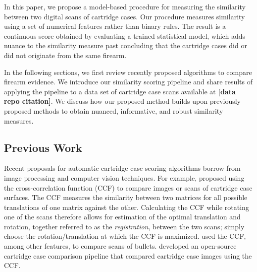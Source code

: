 \documentclass[preprint]{JASA}
\begin{document}
In this paper, we propose a model-based procedure for measuring the
similarity between two digital scans of cartridge cases. Our procedure
measures similarity using a set of numerical features rather than binary
rules. The result is a continuous score obtained by evaluating a trained
statistical model, which adds nuance to the similarity measure past
concluding that the cartridge cases did or did not originate from the
same firearm.

In the following sections, we first review recently proposed algorithms
to compare firearm evidence. We introduce our similarity scoring
pipeline and share results of applying the pipeline to a data set of
cartridge case scans available at \textbf{{[}data repo citation{]}}. We
discuss how our proposed method builds upon previously proposed methods
to obtain nuanced, informative, and robust similarity measures.

\hypertarget{previous-work}{%
\subsection{Previous Work}\label{previous-work}}

Recent proposals for automatic cartridge case scoring algorithms borrow
from image processing and computer vision techniques. For example,
\citet{vorburger_surface_2007} proposed using the cross-correlation
function (CCF) to compare images or scans of cartridge case surfaces.
The CCF measures the similarity between two matrices for all possible
translations of one matrix against the other. Calculating the CCF while
rotating one of the scans therefore allows for estimation of the optimal
translation and rotation, together referred to as the
\emph{registration}, between the two scans; simply choose the
rotation/translation at which the CCF is maximized.
\citet{hare_automatic_2016} used the CCF, among other features, to
compare scans of bullets. \citet{tai_fully_2018} developed an
open-source cartridge case comparison pipeline that compared cartridge
case images using the CCF.
\end{document}
